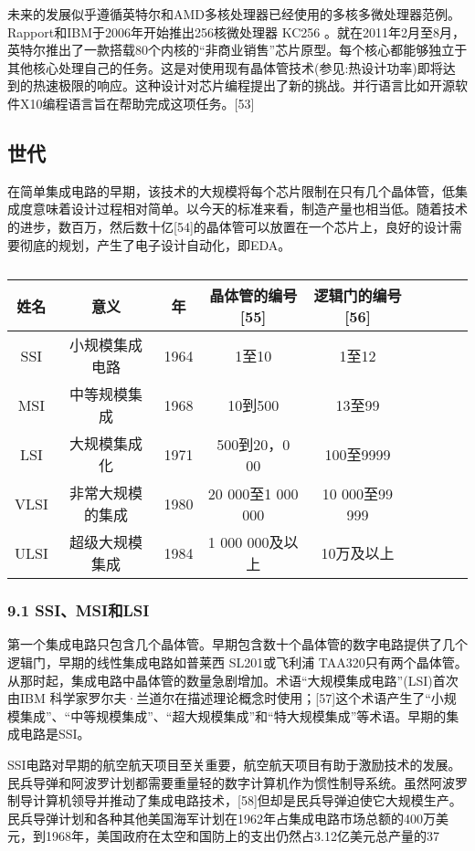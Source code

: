 未来的发展似乎遵循英特尔和AMD多核处理器已经使用的多核多微处理器范例。Rapport和IBM于2006年开始推出256核微处理器 KC256 。就在2011年2月至8月，英特尔推出了一款搭载80个内核的“非商业销售”芯片原型。每个核心都能够独立于其他核心处理自己的任务。这是对使用现有晶体管技术(参见:热设计功率)即将达到的热速极限的响应。这种设计对芯片编程提出了新的挑战。并行语言比如开源软件X10编程语言旨在帮助完成这项任务。[53]

\subsection{世代}

在简单集成电路的早期，该技术的大规模将每个芯片限制在只有几个晶体管，低集成度意味着设计过程相对简单。以今天的标准来看，制造产量也相当低。随着技术的进步，数百万，然后数十亿[54]的晶体管可以放置在一个芯片上，良好的设计需要彻底的规划，产生了电子设计自动化，即EDA。

\begin{table}[ht]
\centering
\caption\label{tab_icJCDL}
\begin{tabular}{|c|c|c|c|c|c|c|c|c}
\hline
\textbf{姓名}&\textbf{意义}& \textbf{年}&\textbf{晶体管的编号[55]}&\textbf{逻辑门的编号[56]} \\
\hline
SSI & 小规模集成电路 & 1964 & 1至10 & 1至12\\
\hline
MSI & 中等规模集成 & 1968 & 10到500 & 13至99 \\
\hline
LSI & 大规模集成化 & 1971 & 500到20，0 00 & 100至9999 \\
\hline
VLSI & 非常大规模的集成 & 1980 & 20 000至1 000 000 & 10 000至99 999 \\
\hline
ULSI & 超级大规模集成 & 1984 & 1 000 000及以上 & 10万及以上 \\
\hline
\end{tabular}
\end{table}

\subsubsection{9.1 SSI、MSI和LSI}

第一个集成电路只包含几个晶体管。早期包含数十个晶体管的数字电路提供了几个逻辑门，早期的线性集成电路如普莱西 SL201或飞利浦 TAA320只有两个晶体管。从那时起，集成电路中晶体管的数量急剧增加。术语“大规模集成电路”(LSI)首次由IBM 科学家罗尔夫·兰道尔在描述理论概念时使用；[57]这个术语产生了“小规模集成”、“中等规模集成”、“超大规模集成”和“特大规模集成”等术语。早期的集成电路是SSI。

SSI电路对早期的航空航天项目至关重要，航空航天项目有助于激励技术的发展。民兵导弹和阿波罗计划都需要重量轻的数字计算机作为惯性制导系统。虽然阿波罗制导计算机领导并推动了集成电路技术，[58]但却是民兵导弹迫使它大规模生产。民兵导弹计划和各种其他美国海军计划在1962年占集成电路市场总额的400万美元，到1968年，美国政府在太空和国防上的支出仍然占3.12亿美元总产量的37%

